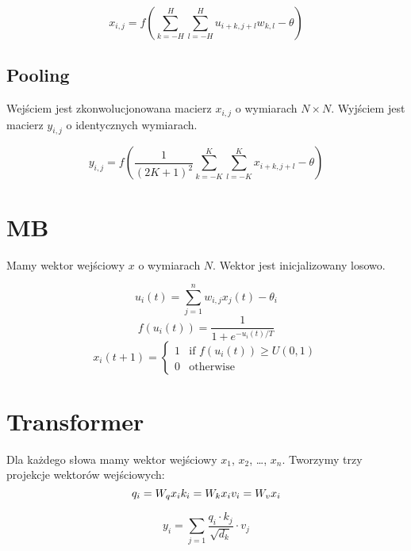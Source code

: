 \documentclass{../notatki}
\begin{document}
$$
x_{i,j} = f(\sum_{k=-H}^{H} \sum_{l=-H}^{H} u_{i+k,j+l} w_{k,l} - \theta)
$$

\subsection{Pooling}

Wejściem jest zkonwolucjonowana macierz $x_{i, j}$ o wymiarach $N \times N$.
Wyjściem jest macierz $y_{i, j}$ o identycznych wymiarach.

$$
y_{i, j} = f(\frac{1}{(2K + 1)^2} \sum_{k=-K}^{K} \sum_{l=-K}^{K}
x_{i+k,j+l} - \theta)
$$

\section{MB}

Mamy wektor wejściowy $x$ o wymiarach $N$. Wektor jest inicjalizowany losowo.

$$
u_i(t) = \sum_{j=1}^{n} w_{i,j} x_j(t) - \theta_i
$$
$$
f(u_i(t)) = \frac{1}{1 + e^{-u_i(t) / T}}
$$
$$
x_i(t + 1) =
\begin{cases}
  1 & \text{if } f(u_i(t)) \geq U(0, 1) \\
  0 & \text{otherwise}
\end{cases}
$$

\section{Transformer}

Dla każdego słowa mamy wektor wejściowy $x_1$, $x_2$, \dots, $x_n$.
Tworzymy trzy projekcje wektorów wejściowych:
$$
q_i = W_q x_i \\
k_i = W_k x_i \\
v_i = W_v x_i
$$

$$
y_i = \sum_{j=1} \frac{q_i \cdot k_j}{\sqrt{d_k}} \cdot v_j
$$
\end{document}
